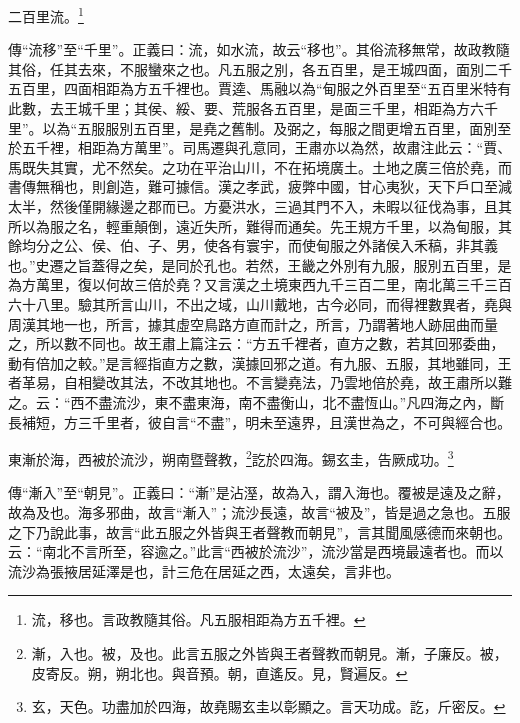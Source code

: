 二百里流。\footnote{流，移也。言政教隨其俗。凡五服相距為方五千裡。}

{\noindent\zhuan{}\fzbyks 傳“流移”至“千里”。正義曰：流，如水流，故云“移也”。其俗流移無常，故政教隨其俗，任其去來，不服蠻來之也。凡五服之別，各五百里，是王城四面，面別二千五百里，四面相距為方五千裡也。賈逵、馬融以為“甸服之外百里至“五百里米特有此數，去王城千里；其侯、綏、要、荒服各五百里，是面三千里，相距為方六千里”。以為“五服服別五百里，是堯之舊制。及弼之，每服之間更增五百里，面別至於五千裡，相距為方萬里”。司馬遷與孔意同，王肅亦以為然，故肅注此云：“賈、馬既失其實，尤不然矣。之功在平治山川，不在拓境廣土。土地之廣三倍於堯，而書傳無稱也，則創造，難可據信。漢之孝武，疲弊中國，甘心夷狄，天下戶口至減太半，然後僅開緣邊之郡而已。方憂洪水，三過其門不入，未暇以征伐為事，且其所以為服之名，輕重顛倒，遠近失所，難得而通矣。先王規方千里，以為甸服，其餘均分之公、侯、伯、子、男，使各有寰宇，而使甸服之外諸侯入禾稿，非其義也。”史遷之旨蓋得之矣，是同於孔也。若然，王畿之外別有九服，服別五百里，是為方萬里，復以何故三倍於堯？又言漢之土境東西九千三百二里，南北萬三千三百六十八里。驗其所言山川，不出之域，山川戴地，古今必同，而得裡數異者，堯與周漢其地一也，所言，據其虛空鳥路方直而計之，所言，乃謂著地人跡屈曲而量之，所以數不同也。故王肅上篇注云：“方五千裡者，直方之數，若其回邪委曲，動有倍加之較。”是言經指直方之數，漢據回邪之道。有九服、五服，其地雖同，王者革易，自相變改其法，不改其地也。不言變堯法，乃雲地倍於堯，故王肅所以難之。云：“西不盡流沙，東不盡東海，南不盡衡山，北不盡恆山。”凡四海之內，斷長補短，方三千里者，彼自言“不盡”，明未至遠界，且漢世為之，不可與經合也。 \par}

東漸於海，西被於流沙，朔南暨聲教，\footnote{漸，入也。被，及也。此言五服之外皆與王者聲教而朝見。漸，子廉反。被，皮寄反。朔，朔北也。與音預。朝，直遙反。見，賢遍反。}訖於四海。錫玄圭，告厥成功。\footnote{玄，天色。功盡加於四海，故堯賜玄圭以彰顯之。言天功成。訖，斤密反。}

{\noindent\zhuan{}\fzbyks 傳“漸入”至“朝見”。正義曰：“漸”是沾溼，故為入，謂入海也。覆被是遠及之辭，故為及也。海多邪曲，故言“漸入”；流沙長遠，故言“被及”，皆是過之急也。五服之下乃說此事，故言“此五服之外皆與王者聲教而朝見”，言其聞風感德而來朝也。云：“南北不言所至，容逾之。”此言“西被於流沙”，流沙當是西境最遠者也。而以流沙為張掖居延澤是也，計三危在居延之西，太遠矣，言非也。 \par}

